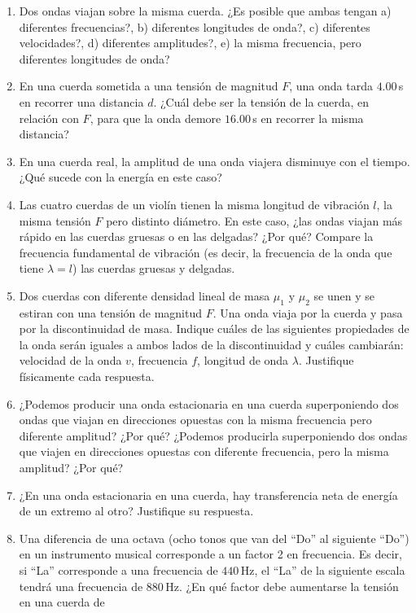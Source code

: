 \documentclass[a4paper,12pt]{article}
\begin{document}
\begin{enumerate}
	\item Dos ondas viajan sobre la misma cuerda. ¿Es posible que ambas
		tengan a) diferentes frecuencias?, b) diferentes longitudes de onda?,
		c) diferentes velocidades?, d) diferentes amplitudes?, e) la misma
		frecuencia, pero diferentes longitudes de onda?
	\item En una cuerda sometida a una tensión de magnitud $F$, una onda tarda
		$4.00$\,s en recorrer una distancia $d$. ¿Cuál debe ser la tensión de
		la cuerda, en relación con $F$, para que la onda demore $16.00$\,s en
		recorrer la misma distancia?
	\item En una cuerda real, la amplitud de una onda viajera disminuye con el
		tiempo. ¿Qué sucede con la energía en este caso?
	\item Las cuatro cuerdas de un violín tienen la misma longitud de vibración
		$l$, la misma tensión $F$ pero distinto diámetro. En este caso, ¿las
		ondas viajan más rápido en las cuerdas gruesas o en las delgadas? ¿Por
		qué? Compare la frecuencia fundamental de vibración (es decir, la
		frecuencia de la onda que tiene $\lambda=l$) las cuerdas gruesas y
		delgadas.
	\item Dos cuerdas con diferente densidad lineal de masa $\mu_1$ y $\mu_2$
		se unen y se estiran con una tensión de magnitud $F$. Una onda viaja
		por la cuerda y pasa por la discontinuidad de masa. Indique cuáles de
		las siguientes propiedades de la onda serán iguales a ambos lados de
		la discontinuidad y cuáles cambiarán: velocidad de la onda $v$,
		frecuencia $f$, longitud de onda $\lambda$.	Justifique físicamente cada
		respuesta.
	\item ¿Podemos producir una onda estacionaria en una cuerda superponiendo
		dos ondas que viajan en direcciones opuestas con la misma frecuencia
		pero diferente amplitud? ¿Por qué? ¿Podemos producirla superponiendo
		dos ondas que viajen en direcciones opuestas con diferente frecuencia,
		pero la misma amplitud? ¿Por qué?
	\item ¿En una onda estacionaria en una cuerda, hay transferencia neta de
		energía de un extremo al otro? Justifique su respuesta.
	\item Una diferencia de una octava (ocho tonos que van del ``Do'' al
		siguiente ``Do'') en un instrumento musical corresponde a un factor 2
		en frecuencia. Es decir, si ``La'' corresponde a una frecuencia de
		$440$\,Hz, el ``La'' de la siguiente escala tendrá una frecuencia de
		$880$\,Hz. ¿En qué factor debe aumentarse la tensión en una cuerda de

\end{enumerate}
\end{document}
